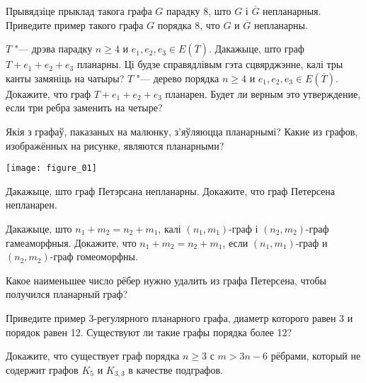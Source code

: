 \documentclass[12pt, a4paper]{article}
\begin{document}
\begin{problemList}
\bigskip

\problemItemSimple
{Прывядзіце прыклад такога графа $G$ парадку 8, што $G$ і $\overline{G}$ непланарныя.}
{Приведите пример такого графа $G$ порядка 8, что $G$ и $\overline{G}$ непланарны.}

\bigskip

\problemItemSimple
{$T$ "--- дрэва парадку $n\ge 4$ и $e_1, e_2, e_3\in E(\overline{T})$.
Дакажыце, што граф $T+e_1+e_2+e_3$ планарны.
Ці будзе справядлівым гэта сцвярджэнне, калі тры канты замяніць на чатыры?}
{$T$ "--- дерево порядка $n\ge 4$ и $e_1, e_2, e_3\in E(\overline{T})$.
Докажите, что граф $T+e_1+e_2+e_3$ планарен.
Будет ли верным это утверждение, если три ребра заменить на четыре?}

\bigskip

\problemItemWithCommonPart
{Якія з графаў, паказаных на малюнку, з'яўляюцца планарнымі?}
{Какие из графов, изображённых на рисунке, являются планарными?}
{%
\begin{center}
    \texttt{[image: figure\_01]}
\end{center}
}

\problemItemSimple
{Дакажыце, што граф Петэрсана непланарны.}
{Докажите, что граф Петерсена непланарен.}

\bigskip

\problemItemSimple
{Дакажыце, што $n_1+m_2=n_2+m_1$, калі $(n_1, m_1)$-граф і $(n_2, m_2)$-граф гамеаморфныя.}
{Докажите, что $n_1+m_2=n_2+m_1$, если $(n_1, m_1)$-граф и $(n_2, m_2)$-граф гомеоморфны.}

\bigskip

{Какое наименьшее число рёбер нужно удалить из графа Петерсена, чтобы получился планарный граф?}

\bigskip

{Приведите пример 3-регулярного планарного графа, диаметр которого равен 3 и порядок равен 12.
Существуют ли такие графы порядка более 12?}

\bigskip

{Докажите, что существует граф порядка $n \ge 3$ с $m > 3n - 6$ рёбрами,
который не содержит графов $K_5$ и $K_{3, 3}$ в качестве подграфов.}


\end{problemList}
\end{document}
